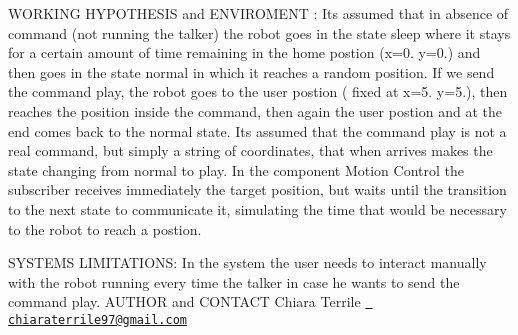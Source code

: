 W\+O\+R\+K\+I\+NG H\+Y\+P\+O\+T\+H\+E\+S\+IS and E\+N\+V\+I\+R\+O\+M\+E\+NT \+: It\textquotesingle{}s assumed that in absence of command (not running the talker) the robot goes in the state \textquotesingle{}sleep\textquotesingle{} where it stays for a certain amount of time remaining in the \textquotesingle{}home\textquotesingle{} postion (x=0. y=0.) and then goes in the state \textquotesingle{}normal\textquotesingle{} in which it reaches a random position. If we send the command \textquotesingle{}play\textquotesingle{}, the robot goes to the \textquotesingle{}user\textquotesingle{} postion ( fixed at x=5. y=5.), then reaches the position inside the command, then again the \textquotesingle{}user\textquotesingle{} postion and at the end comes back to the \textquotesingle{}normal\textquotesingle{} state. It\textquotesingle{}s assumed that the command \textquotesingle{}play\textquotesingle{} is not a real command, but simply a string of coordinates, that when arrives makes the state changing from \textquotesingle{}normal\textquotesingle{} to \textquotesingle{}play\textquotesingle{}. In the component Motion Control the subscriber receives immediately the target position, but waits until the transition to the next state to communicate it, simulating the time that would be necessary to the robot to reach a postion.

S\+Y\+S\+T\+EM\textquotesingle{}S L\+I\+M\+I\+T\+A\+T\+I\+O\+NS\+: In the system the user needs to interact \textquotesingle{}manually\textquotesingle{} with the robot running every time the talker in case he wants to send the command \textquotesingle{}play\textquotesingle{}. A\+U\+T\+H\+OR and C\+O\+N\+T\+A\+CT Chiara Terrile \href{mailto:chiaraterrile97@gmail.com}{\texttt{ chiaraterrile97@gmail.\+com}} 